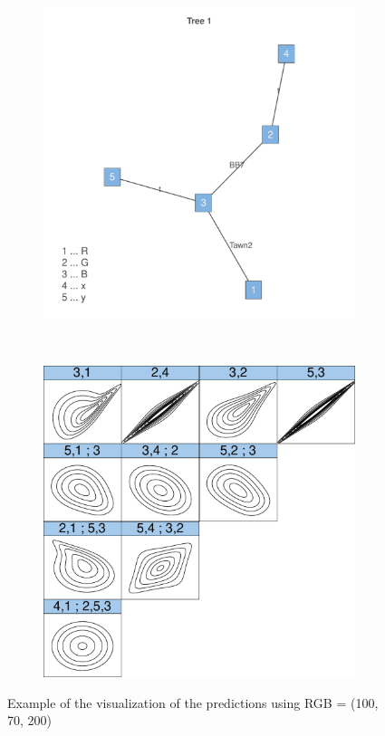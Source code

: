 \documentclass{article}
\begin{document}
\begin{figure}
  \centering
  \begin{subfigure}[b]{0.5\textwidth}
    \includegraphics[width=\textwidth]{tree1}
    \label{fig:heatmap}
  \end{subfigure}%
~
  \begin{subfigure}[b]{0.45\textwidth}
    \includegraphics[width=\textwidth]{contour_copula}
    \label{fig:contour}
  \end{subfigure}
  \caption{Example of the visualization of the predictions using RGB =
    (100, 70, 200)}
\label{fig:predvisualization}
\end{figure}
\end{document}
